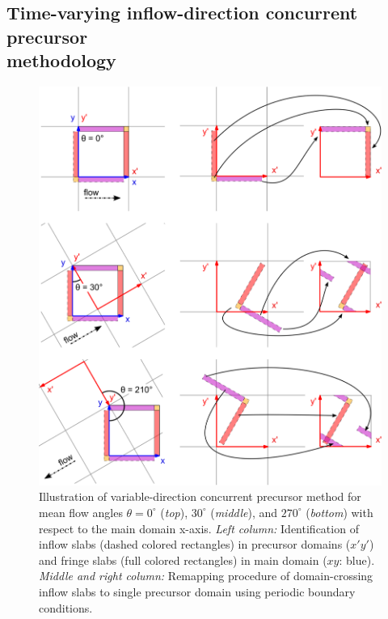 	\subsection{Time-varying inflow-direction concurrent precursor\\methodology}\label{subsec:timevaryingCP}
	\begin{figure}[t]
		\centering
		\includegraphics[width=\textwidth]{chapters/turbulent_inflow/blm/figure5.eps}
		\caption[Illustration of variable-direction concurrent precursor method for mean flow angles $\theta = 0^\circ$, $30^\circ$, and $270^\circ$ with respect to the main domain x-axis.]{Illustration of variable-direction concurrent precursor method for mean flow angles $\theta = 0^\circ$ (\emph{top}), $30^\circ$ (\emph{middle}), and $270^\circ$ (\emph{bottom}) with respect to the main domain x-axis. \emph{Left column: }Identification of inflow slabs (dashed colored rectangles) in precursor domains ($x'y'$) and fringe slabs (full colored rectangles) in main domain ($xy$: blue). \emph{Middle and right column: } Remapping procedure of domain-crossing inflow slabs to single precursor domain using periodic boundary conditions.}
		\label{fig:ConcurrentPrecursorRemapping}
	\end{figure}
	
